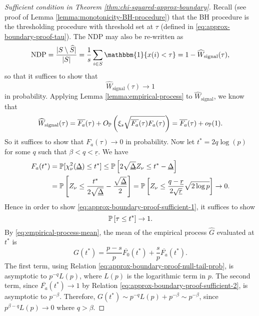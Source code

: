 \begin{proof}[Sufficient condition in Theorem \ref{thm:chi-squared-approx-boundary}]
Recall (see proof of Lemma \ref{lemma:monotonicity-BH-procedure}) that the BH procedure is the thresholding procedure with threshold set at $\tau$ (defined in \eqref{eq:approx-boundary-proof-tau}).
The NDP may also be re-written as 
$$
\text{NDP} = \frac{|{S}\setminus\widehat{S}|}{|{S}|} = \frac{1}{s}\sum_{i\in S}\mathbbm{1}\{x(i) < \tau\} = 1 - \widehat{W}_\text{signal}(\tau),
$$
so that it suffices to show that 
\begin{equation} \label{eq:approx-boundary-proof-sufficient-1}
    \widehat{W}_\text{signal}(\tau)\to 1
\end{equation} in probability.
Applying Lemma \ref{lemma:empirical-process} to $\widehat{W}_\text{signal}$, we know that 
$$
\widehat{W}_\text{signal}(\tau) = \overline{F_a}(\tau) + O_\P\left(\xi_s\sqrt{\overline{F_a}(\tau)F_a(\tau)}\right) = \overline{F_a}(\tau) + o_\P(1).
$$
So it suffices to show that $F_a(\tau)\to 0$ in probability.
Now let $t^* = 2q\log(p)$ for some $q$ such that $\beta<q<\underline{r}$.
We have 
\begin{align}
    F_a(t^*) 
    &= \P[\chi^2_\nu(\underline{\Delta}) \le t^*]
    \le \P\left[2\sqrt{\underline{\Delta}}Z_\nu \le t^* - \underline{\Delta}\right] \nonumber \\
    &= \P\left[Z_\nu \le \frac{t^*}{2\sqrt{\underline{\Delta}}} - \frac{\sqrt{\underline{\Delta}}}{2}\right] 
    = \P\left[Z_\nu \le \frac{q-\underline{r}}{2\sqrt{\underline{r}}}\sqrt{2\log{p}}\right] \to 0. \label{eq:approx-boundary-proof-sufficient-2}
\end{align} 
Hence in order to show \eqref{eq:approx-boundary-proof-sufficient-1}, it suffices to show 
\begin{equation} \label{eq:approx-boundary-proof-sufficient-3}
    \P\left[\tau \le t^*\right] \to 1.
\end{equation}
By \eqref{eq:empirical-process-mean}, the mean of the empirical process $\widehat{G}$ evaluated at $t^*$ is
\begin{equation} \label{eq:approx-boundary-proof-sufficient-4}
    G(t^*) = \frac{p-s}{p}\overline{F_0}(t^*) + \frac{s}{p}\overline{F_a}(t^*).
\end{equation}
The first term, using Relation \eqref{eq:approx-boundary-proof-null-tail-prob}, is asymptotic to $p^{-q}L(p)$, where $L(p)$ is the logarithmic term in $p$.
The second term, since $\overline{F_a}(t^*)\to 1$ by Relation \eqref{eq:approx-boundary-proof-sufficient-2}, is asymptotic to $p^{-\beta}$.
Therefore, $G(t^*) \sim p^{-q}L(p) + p^{-\beta} \sim p^{-\beta}$, since 
$p^{\beta-q}L(p)\to0$ where $q>\beta$.


\end{proof}
